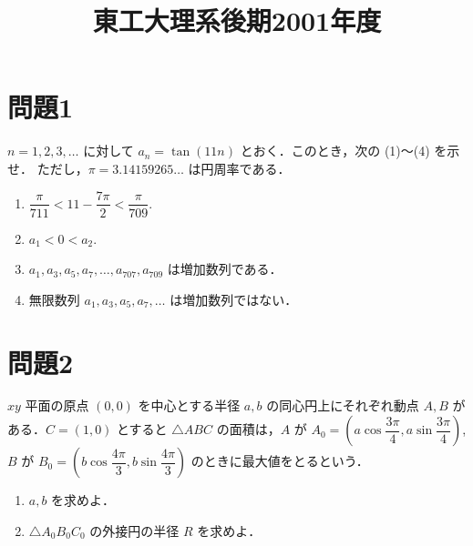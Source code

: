 \documentclass[unicode,12pt, a4paper]{ltjsarticle}%
\title{東工大理系後期2001年度}
\begin{document}
\maketitle
\section{問題1}
$n=1,2,3,\dots$ に対して $a_n = \tan(11n)$ とおく．このとき，次の (1)～(4) を示せ．
ただし，$\pi = 3.14159265\dots$ は円周率である．

\begin{enumerate}
    \item $\dfrac{\pi}{711} < 11 - \dfrac{7\pi}{2} < \dfrac{\pi}{709}$.
    \item $a_1 < 0 < a_2$.
    \item $a_1, a_3, a_5, a_7, \dots, a_{707}, a_{709}$ は増加数列である．
    \item 無限数列 $a_1, a_3, a_5, a_7, \dots$ は増加数列ではない．
\end{enumerate}



\section{問題2}
$xy$ 平面の原点 $(0,0)$ を中心とする半径 $a, b$ の同心円上にそれぞれ動点 $A, B$ がある．$C=(1,0)$ とすると $\triangle ABC$ の面積は，$A$ が $A_0 = \left(a\cos\dfrac{3\pi}{4}, a\sin\dfrac{3\pi}{4}\right)$, $B$ が
$B_0 = \left(b\cos\dfrac{4\pi}{3}, b\sin\dfrac{4\pi}{3}\right)$ のときに最大値をとるという．

\begin{enumerate}
    \item $a, b$ を求めよ．
    \item $\triangle A_0 B_0 C_0$ の外接円の半径 $R$ を求めよ．
\end{enumerate}
\end{document}
